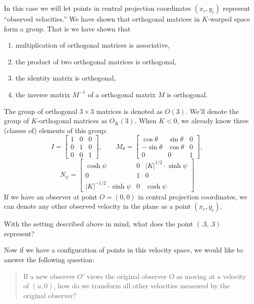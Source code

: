 \documentclass{ximera}
\begin{document}
In this case we will let points in central projection coordinates
$(x_c,y_c)$ represent ``observed velocities.'' We have shown that
orthogonal matrices in $K$-warped space form a group. That is we have
shown that
\begin{enumerate}
\item multiplication of orthogonal matrices is associative, 
\item the product of two orthogonal matrices is orthogonal,
\item the identity matrix is orthogonal,
\item the inverse matrix $M^{-1}$ of a orthogonal matrix $M$ is orthogonal.
\end{enumerate}
The group of orthogonal $3\times 3$ matrices is denoted as
$O(3)$. We'll denote the group of $K$-orthogonal matrices as
$O_K(3)$. When $K<0$, we already know three (classes of) elements of this group:
\[
I =
\begin{bmatrix}
  1 & 0 & 0\\
  0 & 1 & 0\\
  0 & 0 & 1
\end{bmatrix},
\qquad
M_\theta=
\begin{bmatrix}
  \cos\theta & \sin\theta & 0\\
  -\sin\theta & \cos\theta & 0\\
  0 & 0 & 1
\end{bmatrix},
\]
\[
N_\psi=\begin{bmatrix}
\cosh\psi & 0 & |K|^{1/2}\cdot\sinh\psi\\
0 & 1 & 0\\
|K|^{-1/2}\cdot\sinh\psi & 0 & \cosh\psi
\end{bmatrix}
\]
If we have an observer at point $O = (0,0)$ in central projection
coordinates, we can denote any other observed velocity in the plane as
a point $(x_c,y_c)$.

\begin{problem}
  With the setting described above in mind, what does the point
  $(.3,.3)$ represent?
\end{problem}

Now if we have a configuration of points in this velocity space, we
would like to answer the following question:

\begin{quote}
  If a new observer $O'$ views the original observer $O$ as moving at
  a velocity of $(u,0)$, how do we transform all other velocities
  measured by the original observer?
\end{quote}
\end{document}
